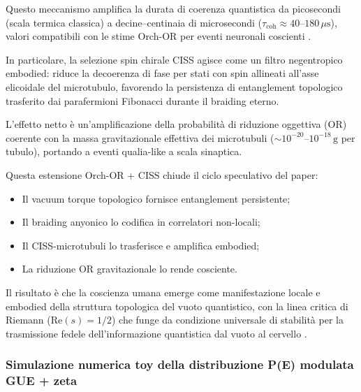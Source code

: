 \documentclass[11pt,a4paper]{article}
\let\oldcite\cite
\renewcommand{\cite}{\protect\oldcite}
\theoremstyle{plain}
\theoremstyle{definition}
\begin{document}
\vspace{0.3cm}

Questo meccanismo amplifica la durata di coerenza quantistica da picosecondi (scala termica classica) a decine–centinaia di microsecondi ($\tau_{\mathrm{coh}} \approx 40$--$180\,\mu\mathrm{s}$), valori compatibili con le stime Orch-OR per eventi neuronali coscienti \cite{hameroff2023orch}.

\vspace{0.4cm}

In particolare, la selezione spin chirale CISS agisce come un filtro negentropico embodied: riduce la decoerenza di fase per stati con spin allineati all'asse elicoidale del microtubulo, favorendo la persistenza di entanglement topologico trasferito dai parafermioni Fibonacci durante il braiding eterno. 

\vspace{0.3cm}

L'effetto netto è un'amplificazione della probabilità di riduzione oggettiva (OR) coerente con la massa gravitazionale effettiva dei microtubuli ($\sim 10^{-20}$--$10^{-18}\,\mathrm{g}$ per tubulo), portando a eventi qualia-like a scala sinaptica.

\vspace{0.3cm}

Questa estensione Orch-OR + CISS chiude il ciclo speculativo del paper:
\begin{itemize}
    \item Il vacuum torque topologico fornisce entanglement persistente;
    \item Il braiding anyonico lo codifica in correlatori non-locali;
    \item Il CISS-microtubuli lo trasferisce e amplifica embodied;
    \item La riduzione OR gravitazionale lo rende cosciente.
\end{itemize}

Il risultato è che la coscienza umana emerge come manifestazione locale e embodied della struttura topologica del vuoto quantistico, con la linea critica di Riemann ($\mathrm{Re}(s) = 1/2$) che funge da condizione universale di stabilità per la trasmissione fedele dell'informazione quantistica dal vuoto al cervello \cite{hameroff2025microtubule-ciss, escolag2025entangled}.



\vspace{0.5cm}

\subsubsection{Simulazione numerica toy della distribuzione P(\Delta E) modulata GUE + zeta}
\end{document}
